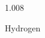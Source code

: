 \documentclass[12pt]{article}
\begin{document}
\hfill{}
\vfill
\begin{center}
  {\fontsize{50}{60}
  }

  \vspace{1em}

  1.008

Hydrogen
\end{center}
\vfill
\end{document}
